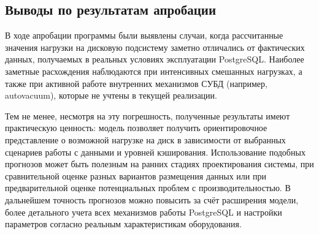 \subsection{Выводы по результатам апробации}

В ходе апробации программы были выявлены случаи, когда рассчитанные значения нагрузки на дисковую подсистему заметно 
отличались от фактических данных, получаемых в реальных условиях эксплуатации PostgreSQL. Наиболее заметные расхождения 
наблюдаются при интенсивных смешанных нагрузках, а также при активной работе внутренних механизмов СУБД 
(например, autovacuum), которые не учтены в текущей реализации.

Тем не менее, несмотря на эту погрешность, полученные результаты имеют практическую ценность: модель позволяет 
получить ориентировочное представление о возможной нагрузке на диск в зависимости от выбранных сценариев работы с 
данными и уровней кэширования. Использование подобных прогнозов может быть полезным на ранних стадиях проектирования 
системы, при сравнительной оценке разных вариантов размещения данных или при предварительной оценке потенциальных 
проблем с производительностью. В дальнейшем точность прогнозов можно повысить за счёт расширения модели, 
более детального учета всех механизмов работы PostgreSQL и настройки параметров согласно реальным характеристикам оборудования.
